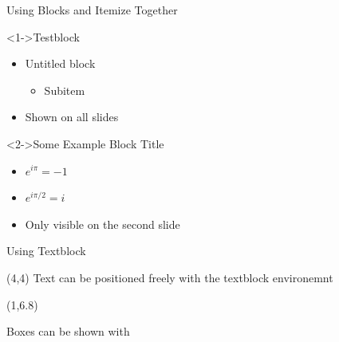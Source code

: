 \documentclass[english,american,german,aspectratio=169]{beamer}
\begin{document}
\begin{frame}{Using Blocks and Itemize Together}

  \begin{block}<1->{Testblock}

    \begin{itemize}
      \item Untitled block

        \begin{itemize}
          \item Subitem
        \end{itemize}
      \item Shown on all slides
    \end{itemize}
  \end{block}

  \begin{block}<2->{Some Example Block Title}

    \begin{itemize}
      \item $e^{i\pi}=-1$
      \item $e^{i\pi/2}=i$
      \item Only visible on the second slide
    \end{itemize}
  \end{block}
\end{frame}
\begin{frame}{Using Textblock}

  \begin{textblock}{5}(4,4)
    Text can be positioned freely with the textblock environemnt
  \end{textblock}
  \begin{textblock}{7}(1,6.8)
    \begin{tcolorbox}
      Boxes can be shown with {}
    \end{tcolorbox}
  \end{textblock}
\end{frame}
\end{document}
